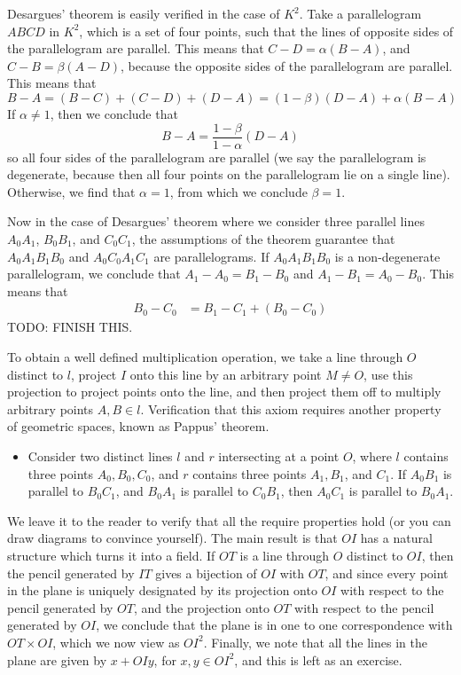 \begin{example}
    Desargues' theorem is easily verified in the case of $K^2$. Take a parallelogram $ABCD$ in $K^2$, which is a set of four points, such that the lines of opposite sides of the parallelogram are parallel. This means that $C-D = \alpha(B-A)$, and $C-B = \beta (A-D)$, because the opposite sides of the parallelogram are parallel. This means that 
    \[ B-A = (B-C)+(C-D)+(D-A) = (1-\beta) (D-A) + \alpha(B-A) \]
    If $\alpha \neq 1$, then we conclude that
    \[ B-A = \frac{1-\beta}{1-\alpha}(D-A) \]
    so all four sides of the parallelogram are parallel (we say the parallelogram is degenerate, because then all four points on the parallelogram lie on a single line). Otherwise, we find that $\alpha = 1$, from which we conclude $\beta = 1$.

    Now in the case of Desargues' theorem where we consider three parallel lines $A_0A_1$, $B_0B_1$, and $C_0C_1$, the assumptions of the theorem guarantee that $A_0A_1B_1B_0$ and $A_0C_0A_1C_1$ are parallelograms. If $A_0A_1B_1B_0$ is a non-degenerate parallelogram, we conclude that $A_1-A_0 =B_1-B_0$ and $A_1-B_1=A_0-B_0$. This means that
    \begin{align*}
        B_0-C_0 &= B_1-C_1+(B_0-C_0)
    \end{align*}
    TODO: FINISH THIS.
\end{example}

To obtain a well defined multiplication operation, we take a line through $O$ distinct to $l$, project $I$ onto this line by an arbitrary point $M \neq O$, use this projection to project points onto the line, and then project them off to multiply arbitrary points $A,B \in l$. Verification that this axiom requires another property of geometric spaces, known as Pappus' theorem.
%
\begin{itemize}
    \item Consider two distinct lines $l$ and $r$ intersecting at a point $O$, where $l$ contains three points $A_0,B_0,C_0$, and $r$ contains three points $A_1,B_1$, and $C_1$. If $A_0B_1$ is parallel to $B_0C_1$, and $B_0A_1$ is parallel to $C_0B_1$, then $A_0C_1$ is parallel to $B_0A_1$.
\end{itemize}
%
We leave it to the reader to verify that all the require properties hold (or you can draw diagrams to convince yourself). The main result is that $OI$ has a natural structure which turns it into a field. If $OT$ is a line through $O$ distinct to $OI$, then the pencil generated by $IT$ gives a bijection of $OI$ with $OT$, and since every point in the plane is uniquely designated by its projection onto $OI$ with respect to the pencil generated by $OT$, and the projection onto $OT$ with respect to the pencil generated by $OI$, we conclude that the plane is in one to one correspondence with $OT \times OI$, which we now view as $OI^2$. Finally, we note that all the lines in the plane are given by $x + OIy$, for $x,y \in OI^2$, and this is left as an exercise. 

